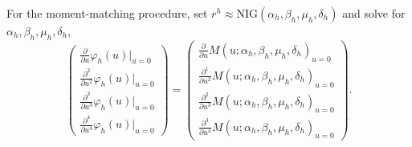 For the moment-matching procedure, set
$r^h\approx \text{NIG}(\alpha_h, \beta_h, \mu_h, \delta_h)$ and solve
for $\alpha_h, \beta_h, \mu_h, \delta_h$, 
\begin{equation*}
  \begin{pmatrix}
    \frac{\partial}{\partial u} \varphi_h(u)\big|_{u=0}\\[5pt]
    \frac{\partial^2}{\partial u^2} \varphi_h(u)\big|_{u=0}\\[5pt]
    \frac{\partial^3}{\partial u^3} \varphi_h(u)\big|_{u=0}\\[5pt]
    \frac{\partial^4}{\partial u^4} \varphi_h(u)\big|_{u=0}
  \end{pmatrix}
  =
  \begin{pmatrix}
    \frac{\partial}{\partial u} M(u;\alpha_h, \beta_h, \mu_h,
    \delta_h)_{u=0}\\[5pt]
    \frac{\partial^1}{\partial u^2} M(u;\alpha_h, \beta_h, \mu_h,
    \delta_h)_{u=0}\\[5pt]
    \frac{\partial^2}{\partial u^3} M(u;\alpha_h, \beta_h, \mu_h,
    \delta_h)_{u=0}\\[5pt]
    \frac{\partial^3}{\partial u^4} M(u;\alpha_h, \beta_h, \mu_h,
    \delta_h)_{u=0}
  \end{pmatrix}.
\end{equation*}

